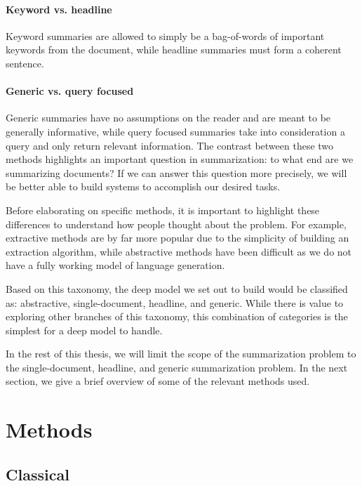 \documentclass[11pt]{report}
\begin{document}
\paragraph{Keyword vs. headline} Keyword summaries are allowed to simply be a bag-of-words of important keywords from the document, while headline summaries must form a coherent sentence.

\paragraph{Generic vs. query focused} Generic summaries have no assumptions on the reader and are meant to be generally informative, while query focused summaries take into consideration a query and only return relevant information. The contrast between these two methods highlights an important question in summarization: to what end are we summarizing documents? If we can answer this question more precisely, we will be better able to build systems to accomplish our desired tasks.

\vspace{0.5cm}

Before elaborating on specific methods, it is important to highlight these differences to understand how people thought about the problem. For example, extractive methods are by far more popular due to the simplicity of building an extraction algorithm, while abstractive methods have been difficult as we do not have a fully working model of language generation.

Based on this taxonomy, the deep model we set out to build would be classified as: abstractive, single-document, headline, and generic. While there is value to exploring other branches of this taxonomy, this combination of categories is the simplest for a deep model to handle.

In the rest of this thesis, we will limit the scope of the summarization problem to the single-document,  headline, and generic summarization problem. In the next section, we give a brief overview of some of the relevant methods used.


\section{Methods}



\subsection{Classical}
\end{document}
